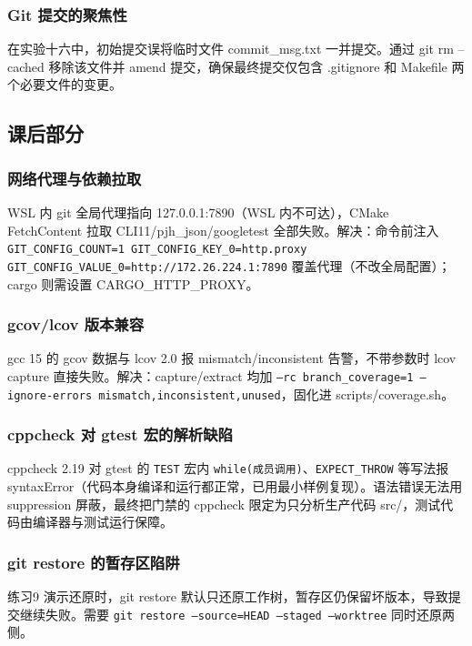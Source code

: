 \documentclass[UTF8]{ctexart}
\begin{document}
\subsubsection{Git 提交的聚焦性}

在实验十六中，初始提交误将临时文件 commit\_msg.txt 一并提交。通过 git rm --cached 移除该文件并 amend 提交，确保最终提交仅包含 .gitignore 和 Makefile 两个必要文件的变更。

\subsection{课后部分}

\subsubsection{网络代理与依赖拉取}

WSL 内 git 全局代理指向 127.0.0.1:7890（WSL 内不可达），CMake FetchContent 拉取 CLI11/pjh\_json/googletest 全部失败。解决：命令前注入 \texttt{GIT\_CONFIG\_COUNT=1 GIT\_CONFIG\_KEY\_0=http.proxy GIT\_CONFIG\_VALUE\_0=http://172.26.224.1:7890} 覆盖代理（不改全局配置）；cargo 则需设置 CARGO\_HTTP\_PROXY。

\subsubsection{gcov/lcov 版本兼容}

gcc 15 的 gcov 数据与 lcov 2.0 报 mismatch/inconsistent 告警，不带参数时 lcov capture 直接失败。解决：capture/extract 均加 \texttt{--rc branch\_coverage=1 --ignore-errors mismatch,inconsistent,unused}，固化进 scripts/coverage.sh。

\subsubsection{cppcheck 对 gtest 宏的解析缺陷}

cppcheck 2.19 对 gtest 的 \texttt{TEST} 宏内 \texttt{while(成员调用)}、\texttt{EXPECT\_THROW} 等写法报 syntaxError（代码本身编译和运行都正常，已用最小样例复现）。语法错误无法用 suppression 屏蔽，最终把门禁的 cppcheck 限定为只分析生产代码 src/，测试代码由编译器与测试运行保障。

\subsubsection{git restore 的暂存区陷阱}

练习9 演示还原时，git restore 默认只还原工作树，暂存区仍保留坏版本，导致提交继续失败。需要 \texttt{git restore --source=HEAD --staged --worktree} 同时还原两侧。
\end{document}
